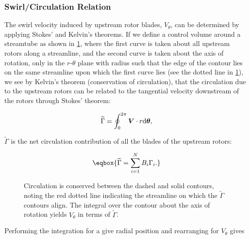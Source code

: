 \subsubsection{Swirl/Circulation Relation}

The swirl velocity induced by upstream rotor blades, \(V_\theta\), can be determined by applying Stokes' and Kelvin's theorems.
%
If we define a control volume around a streamtube as shown in  \cref{fig:circulationsum}, where the first curve is taken about all upstream rotors along a streamline, and the second curve is taken about the axis of rotation, only in the \(r\)-\(\theta\) plane with radius such that the edge of the contour lies on the same streamline upon which the first curve lies (see the dotted line in \cref{fig:circulationsum}), we see by Kelvin's theorem (conservation of circulation), that the circulation due to the upstream rotors can be related to the tangential velocity downstream of the rotors through Stokes' theorem:

\begin{equation}
    \widetilde{\Gamma} = \oint_0^{2\pi} \bm{V} \cdot r \mathrm{d} \bm{\theta},
\end{equation}

\where \(\widetilde{\Gamma}\) is the net circulation contribution of all the blades of the upstream rotors:

\begin{equation}
    \label{eqn:gamma_tilde}
    \eqbox{
        \widetilde{\Gamma} = \sum_{i=1}^N B_i \Gamma_i.
    }
\end{equation}


\begin{figure}[h!]
    \centering
    
    \caption{Circulation is conserved between the dashed and solid contours, noting the red dotted line indicating the streamline on which the \(\widetilde{\Gamma}\) contours align. The integral over the contour about the axis of rotation yields \(V_\theta\) in terms of \(\widetilde{\Gamma}\).}
    \label{fig:circulationsum}
\end{figure}

\noindent Performing the integration for a give radial position and rearranging for \(V_\theta\) gives

